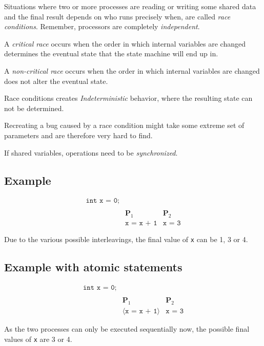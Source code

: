 
Situations where two or more processes are reading or writing some shared data and the final result depends on who runs precisely when, are called \emph{race conditions}. Remember, processors are completely \emph{independent}.

A \emph{critical race} occurs when the order in which internal variables are changed determines the eventual state that the state machine will end up in.

A \emph{non-critical race} occurs when the order in which internal variables are changed does not alter the eventual state.

Race conditions creates \emph{Indeterministic} behavior, where the resulting state can not be determined.

Recreating a bug caused by a race condition might take some extreme set of parameters and are therefore very hard to find.

If shared variables, operations need to be \emph{synchronized}.

\subsection{Example}
\begin{align*}
\texttt{int x = 0;} \\ \\
&\textbf{P}_1 &\textbf{P}_2 \\
&\texttt{x = x + 1} &\texttt{x = 3}
\end{align*}

Due to the various possible interleavings, the final value of \texttt{x} can be 1, 3 or 4.



\subsection{Example with atomic statements}
\begin{align*}
\texttt{int x = 0;} \\ \\
&\textbf{P}_1 &\textbf{P}_2 \\
&\big \langle \texttt{x = x + 1} \big \rangle &\texttt{x = 3}
\end{align*}

As the two processes can only be executed sequentially now, the possible final values of \texttt{x} are 3 or 4.


